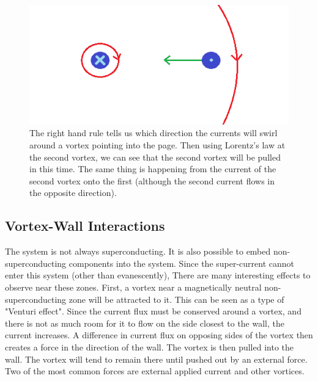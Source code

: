 \begin{figure}[htbp]
\begin{center}
\includegraphics[scale=.50]{oppositeVortex.png}
\caption{The right hand rule tells us which direction the currents will swirl around a vortex pointing into the page. Then using Lorentz's law  at the second vortex, we can see that the second vortex will be pulled in this time. The same thing is happening from the current of the second vortex onto the first (although the second current flows in the opposite direction).}
\label{diffV}
\end{center}
\end{figure}

\subsection{Vortex-Wall Interactions}
The system is not always superconducting. It is also possible to embed non-superconducting components into the system. Since the super-current cannot enter this system (other than evanescently), There are many interesting effects to observe near these zones. First, a vortex near a magnetically neutral non-superconducting zone will be attracted to it. This can be seen as a type of "Venturi effect". Since the current flux must be conserved around a vortex, and there is not as much room for it to flow on the side closest to the wall, the current increases. A difference in current flux on opposing sides of the vortex then creates a force in the direction of the wall. The vortex is then pulled into the wall. The vortex will tend to remain there until pushed out by an external force. Two of the most common forces are external applied current and other vortices.
 

